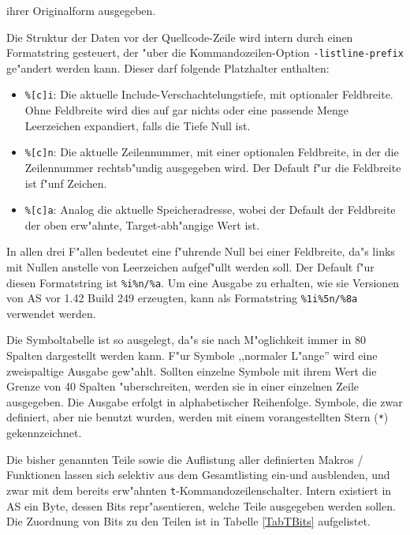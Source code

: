 \documentclass[12pt,a4paper,twoside]{report}
\newcommand{\tty}[1]{{\tt #1}}
\newcommand{\asname}{AS}
\begin{document}
ihrer Originalform ausgegeben.
\par
Die Struktur der Daten vor der Quellcode-Zeile wird intern
durch einen Formatstring gesteuert, der "uber die Kommandozeilen-Option
{\tt -listline-prefix} ge"andert werden kann.  Dieser darf folgende
Platzhalter enthalten:
\begin{itemize}
\item{{\tt \%[c]i}: Die aktuelle Include-Verschachtelungstiefe, mit optionaler
      Feldbreite.  Ohne Feldbreite wird dies auf gar nichts oder eine
      passende Menge Leerzeichen expandiert, falls die Tiefe Null ist.}
\item{{\tt \%[c]n}: Die aktuelle Zeilennummer, mit einer optionalen Feldbreite,
      in der die Zeilennummer rechtsb"undig ausgegeben wird.  Der Default
      f"ur die Feldbreite ist f"unf Zeichen.}
\item{{\tt \%[c]a}: Analog die aktuelle Speicheradresse, wobei der Default
      der Feldbreite der oben erw"ahnte, Target-abh"angige Wert ist.}
\end{itemize}
In allen drei F"allen bedeutet eine f"uhrende Null bei einer Feldbreite, da"s
links mit Nullen anstelle von Leerzeichen aufgef"ullt werden soll.
Der Default f"ur diesen Formatstring ist \verb!%i%n/%a!.  Um eine Ausgabe
zu erhalten, wie sie Versionen von \asname{} vor 1.42 Build 249 erzeugten,
kann als Formatstring \verb!%1i%5n/%8a! verwendet werden.
\par
Die Symboltabelle ist so ausgelegt, da"s sie nach M"oglichkeit immer in 80
Spalten dargestellt werden kann.  F"ur Symbole ,,normaler L"ange'' wird
eine zweispaltige Ausgabe gew"ahlt.  Sollten einzelne Symbole mit ihrem
Wert die Grenze von 40 Spalten "uberschreiten, werden sie in einer
einzelnen Zeile ausgegeben.  Die Ausgabe erfolgt in alphabetischer
Reihenfolge.  Symbole, die zwar definiert, aber nie benutzt wurden,
werden mit einem vorangestellten Stern (\verb!*!) gekennzeichnet.
\par
Die bisher genannten Teile sowie die Auflistung aller definierten
Makros / Funktionen lassen sich selektiv aus dem Gesamtlisting ein-und
ausblenden, und zwar mit dem bereits erw"ahnten \tty{t}-Kommandozeilenschalter.
Intern existiert in \asname{} ein Byte, dessen Bits repr"asentieren, welche Teile
ausgegeben werden sollen.  Die Zuordnung von Bits zu den Teilen ist in
Tabelle \ref{TabTBits} aufgelistet.
\par
\end{document}
